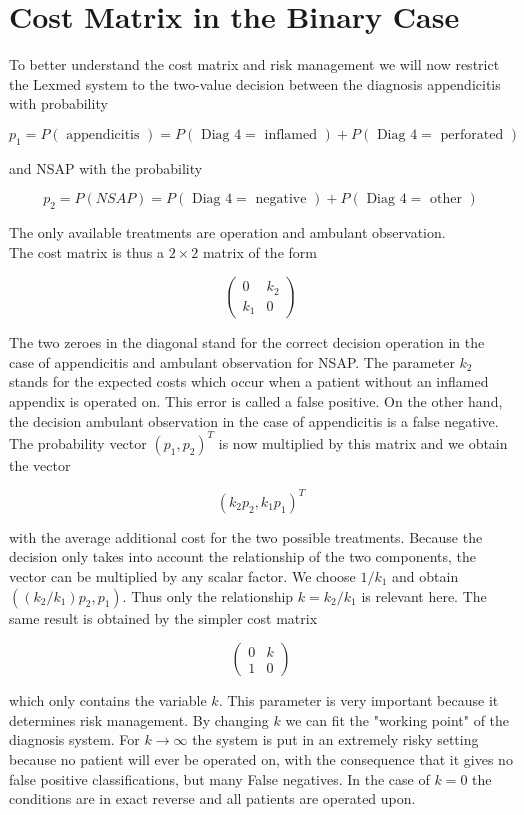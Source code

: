 \documentclass[10pt]{book}
\begin{document}
\section{Cost Matrix in the Binary Case}
To better understand the cost matrix and risk management we will now restrict the Lexmed system to the two-value decision between the diagnosis appendicitis with probability

$$
p_{1}=P(\text { appendicitis })=P(\text { Diag } 4=\text { inflamed })+P(\text { Diag } 4=\text { perforated })
$$

and NSAP with the probability

$$
p_{2}=P(N S A P)=P(\text { Diag } 4=\text { negative })+P(\text { Diag } 4=\text { other })
$$

The only available treatments are operation and ambulant observation.\\
The cost matrix is thus a $2 \times 2$ matrix of the form

$$
\left(\begin{array}{cc}
0 & k_{2} \\
k_{1} & 0
\end{array}\right)
$$

The two zeroes in the diagonal stand for the correct decision operation in the case of appendicitis and ambulant observation for NSAP. The parameter $k_{2}$ stands for the expected costs which occur when a patient without an inflamed appendix is operated on. This error is called a false positive. On the other hand, the decision ambulant observation in the case of appendicitis is a false negative. The probability vector $\left(p_{1}, p_{2}\right)^{T}$ is now multiplied by this matrix and we obtain the vector

$$
\left(k_{2} p_{2}, k_{1} p_{1}\right)^{T}
$$

with the average additional cost for the two possible treatments. Because the decision only takes into account the relationship of the two components, the vector can be multiplied by any scalar factor. We choose $1 / k_{1}$ and obtain $\left(\left(k_{2} / k_{1}\right) p_{2}, p_{1}\right)$. Thus only the relationship $k=k_{2} / k_{1}$ is relevant here. The same result is obtained by the simpler cost matrix

$$
\left(\begin{array}{ll}
0 & k \\
1 & 0
\end{array}\right)
$$

which only contains the variable $k$. This parameter is very important because it determines risk management. By changing $k$ we can fit the "working point" of the diagnosis system. For $k \rightarrow \infty$ the system is put in an extremely risky setting because no patient will ever be operated on, with the consequence that it gives no false positive classifications, but many False negatives. In the case of $k=0$ the conditions are in exact reverse and all patients are operated upon.
\end{document}
